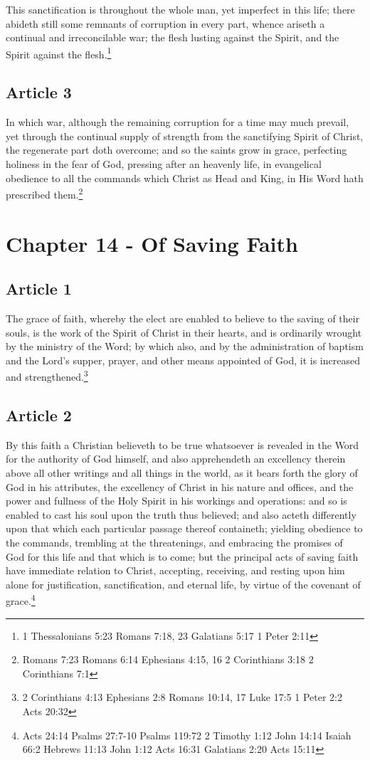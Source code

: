 \documentclass[12pt,letterpaper]{book}
\begin{document}
This sanctification is throughout the whole man, yet imperfect in this life; there abideth still some remnants of corruption in every part, whence ariseth a continual and irreconcilable war; the flesh lusting against the Spirit, and the Spirit against the flesh.\footnote{1 Thessalonians 5:23 Romans 7:18, 23 Galatians 5:17 1 Peter 2:11}

\section{Article 3}

In which war, although the remaining corruption for a time may much prevail, yet through the continual supply of strength from the sanctifying Spirit of Christ, the regenerate part doth overcome; and so the saints grow in grace, perfecting holiness in the fear of God, pressing after an heavenly life, in evangelical obedience to all the commands which Christ as Head and King, in His Word hath prescribed them.\footnote{Romans 7:23 Romans 6:14 Ephesians 4:15, 16 2 Corinthians 3:18 2 Corinthians 7:1}

\chapter{Chapter 14 - Of Saving Faith}
\section{Article 1}

The grace of faith, whereby the elect are enabled to believe to the saving of their souls, is the work of the Spirit of Christ in their hearts, and is ordinarily wrought by the ministry of the Word; by which also, and by the administration of baptism and the Lord's supper, prayer, and other means appointed of God, it is increased and strengthened.\footnote{2 Corinthians 4:13 Ephesians 2:8 Romans 10:14, 17 Luke 17:5 1 Peter 2:2 Acts 20:32}

\section{Article 2}

By this faith a Christian believeth to be true whatsoever is revealed in the Word for the authority of God himself, and also apprehendeth an excellency therein above all other writings and all things in the world, as it bears forth the glory of God in his attributes, the excellency of Christ in his nature and offices, and the power and fullness of the Holy Spirit in his workings and operations: and so is enabled to cast his soul upon the truth thus believed; and also acteth differently upon that which each particular passage thereof containeth; yielding obedience to the commands, trembling at the threatenings, and embracing the promises of God for this life and that which is to come; but the principal acts of saving faith have immediate relation to Christ, accepting, receiving, and resting upon him alone for justification, sanctification, and eternal life, by virtue of the covenant of grace.\footnote{Acts 24:14 Psalms 27:7-10 Psalms 119:72 2 Timothy 1:12 John 14:14 Isaiah 66:2 Hebrews 11:13 John 1:12 Acts 16:31 Galatians 2:20 Acts 15:11}
\end{document}
